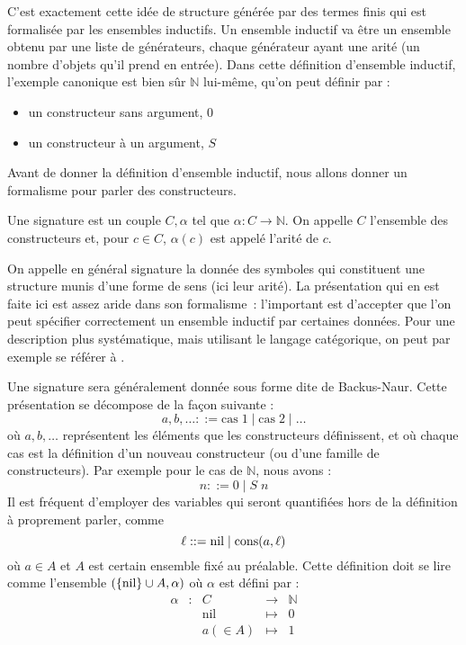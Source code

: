 C'est exactement cette idée de structure générée par des termes finis qui est
formalisée par les ensembles inductifs. Un ensemble inductif va être un ensemble
obtenu par une liste de générateurs, chaque générateur ayant une arité (un
nombre d'objets qu'il prend en entrée). Dans cette définition d'ensemble
inductif, l'exemple canonique est bien sûr $\mathbb N$ lui-même, qu'on peut
définir par :
\begin{itemize}
\item un constructeur sans argument, $0$
\item un constructeur à un argument, $S$
\end{itemize}

Avant de donner la définition d'ensemble inductif, nous allons donner un
formalisme pour parler des constructeurs.

\begin{definition}[Signature]
  Une signature est un couple $C,\alpha$ tel que $\alpha : C \to \mathbb N$.
  On appelle $C$ l'ensemble des constructeurs et, pour $c \in C$, $\alpha(c)$
  est appelé l'arité de $c$.
\end{definition}

On appelle en général signature la donnée des symboles qui constituent une
structure munis d'une forme de sens (ici leur arité). La présentation qui en est
faite ici est assez aride dans son formalisme~: l'important est d'accepter que
l'on peut spécifier correctement un ensemble inductif par certaines données.
Pour une description plus systématique, mais utilisant le langage catégorique,
on peut par exemple se référer à \cite{JacobsCLTT}.

Une signature sera généralement donnée sous forme dite de Backus-Naur. Cette
présentation se décompose de la façon suivante :
\[a,b,\ldots ::= \mathrm{cas}\;1 \mid \mathrm{cas}\;2 \mid \ldots\]
où $a,b,\ldots$ représentent les éléments que les constructeurs définissent,
et où chaque cas est la définition d'un nouveau constructeur (ou d'une famille
de constructeurs). Par exemple pour le cas de $\mathbb N$, nous avons :
\[n ::= 0 \mid S\;n\]
Il est fréquent d'employer des variables qui seront quantifiées hors de la
définition à proprement parler, comme
\[\ell ::= \operatorname{nil} \mid \operatorname{cons}(a,\ell)\]
où $a \in A$ et $A$ est certain ensemble fixé au préalable. Cette définition
doit se lire comme l'ensemble $(\{\operatorname{nil}\} \cup A,\alpha)$ où $\alpha$
est défini par :
\[
\begin{array}{rcccl}
  \alpha &:& C & \longrightarrow & \mathbb N\\
  & & \mathrm{nil} & \longmapsto & 0 \\
  & & a (\in A) & \longmapsto & 1
\end{array}
\]

